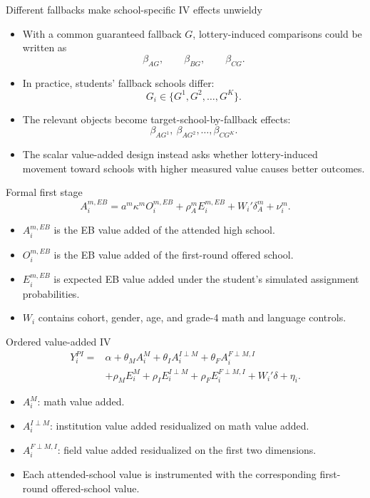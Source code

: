 \documentclass[11pt,aspectratio=169]{beamer}
\newenvironment{wideitemize}{%
  \begin{minipage}{0.92\textwidth}
  \begin{itemize}
  \addtolength{\itemsep}{0.85em}
}{%
  \end{itemize}
  \end{minipage}
}
\begin{document}
\begin{frame}{Different fallbacks make school-specific IV effects unwieldy}
\small
\begin{itemize}
  \addtolength{\itemsep}{0.45em}
  \item With a common guaranteed fallback $G$, lottery-induced comparisons could be written as
  \[
    \beta_{AG},\qquad \beta_{BG},\qquad \beta_{CG}.
  \]

  \item In practice, students' fallback schools differ:
  \[
    G_i\in\{G^1,G^2,\ldots,G^K\}.
  \]

  \item The relevant objects become target-school-by-fallback effects:
  \[
    \beta_{AG^1},\ \beta_{AG^2},\ldots,\beta_{CG^K}.
  \]

  \item The scalar value-added design instead asks whether lottery-induced movement toward schools with higher measured value causes better outcomes.
\end{itemize}
\end{frame}

\begin{frame}{Formal first stage}
\[
  A_i^{m,EB}
  =
  a^m
  \kappa^m O_i^{m,EB}
  + \rho_A^m E_i^{m,EB}
  + W_i'\delta_A^m
  + \nu_i^m.
\]

\begin{wideitemize}
  \item $A_i^{m,EB}$ is the EB value added of the attended high school.
  \item $O_i^{m,EB}$ is the EB value added of the first-round offered school.
  \item $E_i^{m,EB}$ is expected EB value added under the student's simulated assignment probabilities.
  \item $W_i$ contains cohort, gender, age, and grade-4 math and language controls.
\end{wideitemize}
\end{frame}

\begin{frame}{Ordered value-added IV}
\footnotesize
\vspace{0.4em}
\[
\begin{aligned}
Y_i^{PI}
= {}& \alpha
+ \theta_M A_i^M
+ \theta_I A_i^{I\perp M}
+ \theta_F A_i^{F\perp M,I} \\
&+ \rho_M E_i^M
+ \rho_I E_i^{I\perp M}
+ \rho_F E_i^{F\perp M,I}
+ W_i'\delta
+ \eta_i.
\end{aligned}
\]

\begin{itemize}
  \addtolength{\itemsep}{0.45em}
  \item $A_i^M$: math value added.
  \item $A_i^{I\perp M}$: institution value added residualized on math value added.
  \item $A_i^{F\perp M,I}$: field value added residualized on the first two dimensions.
  \item Each attended-school value is instrumented with the corresponding first-round offered-school value.
\end{itemize}
\end{frame}
\end{document}
